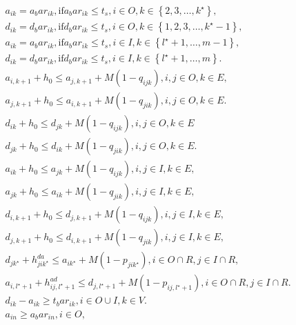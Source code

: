 \begin{align}
  & a_{i k} = a_bar_{i k} , \text{if} a_bar_{i k} \leq t_{s} , i \in O , k \in \left\{2 , 3 , \ldots , k^{\star}\right\} , \tag{eq\_0002} \\
  & d_{i k} = d_bar_{i k} , \text{if} d_bar_{i k} \leq t_{s} , i \in O , k \in \left\{1 , 2 , 3 , \ldots , k^{\star} - 1\right\} , \tag{eq\_0003} \\
  & a_{i k} = a_bar_{i k} , \text{if} a_bar_{i k} \leq t_{s} , i \in I , k \in \left\{l^{\star} + 1 , \ldots , m - 1\right\} , \tag{eq\_0004} \\
  & d_{i k} = d_bar_{i k} , \text{if} d_bar_{i k} \leq t_{s} , i \in I , k \in \left\{l^{\star} + 1 , \ldots , m\right\} . \tag{eq\_0005} \\
  & a_{i , k + 1} + h_{0} \leq a_{j , k + 1} + M \left(1 - q_{i j k}\right) , i , j \in O , k \in E , \tag{eq\_0006} \\
  & a_{j , k + 1} + h_{0} \leq a_{i , k + 1} + M \left(1 - q_{j i k}\right) , i , j \in O , k \in E . \tag{eq\_0007} \\
  & d_{i k} + h_{0} \leq d_{j k} + M \left(1 - q_{i j k}\right) , i , j \in O , k \in E \tag{eq\_0008} \\
  & d_{j k} + h_{0} \leq d_{i k} + M \left(1 - q_{j i k}\right) , i , j \in O , k \in E . \tag{eq\_0009} \\
  & a_{i k} + h_{0} \leq a_{j k} + M \left(1 - q_{i j k}\right) , i , j \in I , k \in E , \tag{eq\_0010} \\
  & a_{j k} + h_{0} \leq a_{i k} + M \left(1 - q_{j i k}\right) , i , j \in I , k \in E , \tag{eq\_0011} \\
  & d_{i , k + 1} + h_{0} \leq d_{j , k + 1} + M \left(1 - q_{i j k}\right) , i , j \in I , k \in E , \tag{eq\_0012} \\
  & d_{j , k + 1} + h_{0} \leq d_{i , k + 1} + M \left(1 - q_{j i k}\right) , i , j \in I , k \in E , \tag{eq\_0013} \\
  & d_{j k^{\star}} + h_{j i k^{\star}}^{d a} \leq a_{i k^{\star}} + M \left(1 - p_{j i k^{\star}}\right) , i \in O \cap R , j \in I \cap R , \tag{eq\_0014} \\
  & a_{i , l^{\star} + 1} + h_{i j , l^{\star} + 1}^{a d} \leq d_{j , l^{\star} + 1} + M \left(1 - p_{i j , l^{\star} + 1}\right) , i \in O \cap R , j \in I \cap R . \tag{eq\_0015} \\
  & d_{i k} - a_{i k} \geq t_bar_{i k} , i \in O \cup I , k \in V . \tag{eq\_0016} \\
  & a_{i n} \geq a_bar_{i n} , i \in O , \tag{eq\_0017} \\

\end{align}
